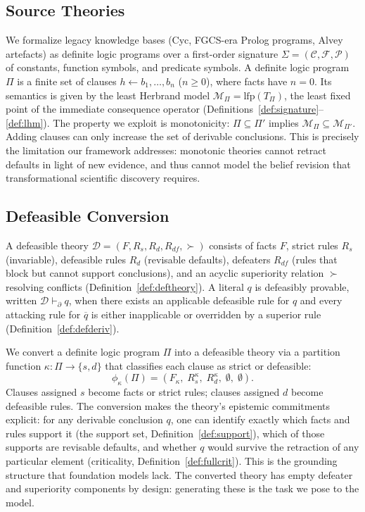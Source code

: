 \documentclass{article}
\theoremstyle{definition}
\newcommand{\D}{\mathcal{D}}
\newcommand{\Rs}{R_s}
\newcommand{\Rd}{R_d}
\newcommand{\Rdf}{R_{df}}
\newcommand{\partfunc}{\kappa}
\newcommand{\pPartial}{\vdash_{\partial}}
\newcommand{\comp}[1]{\overline{#1}}
\begin{document}
\subsection{Source Theories}\label{subsec:source}

We formalize legacy knowledge bases (Cyc, FGCS-era Prolog programs, Alvey artefacts) as definite logic programs over a first-order signature $\Sigma = (\mathcal{C}, \mathcal{F}, \mathcal{P})$ of constants, function symbols, and predicate symbols. A definite logic program $\Pi$ is a finite set of clauses $h \leftarrow b_1, \ldots, b_n$ ($n \geq 0$), where facts have $n = 0$. Its semantics is given by the least Herbrand model $\mathcal{M}_\Pi = \mathrm{lfp}(T_\Pi)$, the least fixed point of the immediate consequence operator (Definitions~\ref{def:signature}--\ref{def:lhm}). The property we exploit is monotonicity: $\Pi \subseteq \Pi'$ implies $\mathcal{M}_\Pi \subseteq \mathcal{M}_{\Pi'}$. Adding clauses can only increase the set of derivable conclusions. This is precisely the limitation our framework addresses: monotonic theories cannot retract defaults in light of new evidence, and thus cannot model the belief revision that transformational scientific discovery requires.


\subsection{Defeasible Conversion}\label{subsec:conversion}

A defeasible theory $\D = (F, \Rs, \Rd, \Rdf, {\succ})$ consists of facts $F$, strict rules $\Rs$ (invariable), defeasible rules $\Rd$ (revisable defaults), defeaters $\Rdf$ (rules that block but cannot support conclusions), and an acyclic superiority relation $\succ$ resolving conflicts (Definition~\ref{def:deftheory}). A literal $q$ is defeasibly provable, written $\D \pPartial q$, when there exists an applicable defeasible rule for $q$ and every attacking rule for $\comp{q}$ is either inapplicable or overridden by a superior rule (Definition~\ref{def:defderiv}).

We convert a definite logic program $\Pi$ into a defeasible theory via a partition function $\partfunc: \Pi \to \{s, d\}$ that classifies each clause as strict or defeasible:
\begin{equation}\label{eq:conversion}
    \phi_\partfunc(\Pi) = (F_\partfunc,\; \Rs^{\partfunc},\; \Rd^{\partfunc},\; \emptyset,\; \emptyset).
\end{equation}
Clauses assigned $s$ become facts or strict rules; clauses assigned $d$ become defeasible rules. The conversion makes the theory's epistemic commitments explicit: for any derivable conclusion $q$, one can identify exactly which facts and rules support it (the support set, Definition~\ref{def:support}), which of those supports are revisable defaults, and whether $q$ would survive the retraction of any particular element (criticality, Definition~\ref{def:fullcrit}). This is the grounding structure that foundation models lack. The converted theory has empty defeater and superiority components by design: generating these is the task we pose to the model.
\end{document}
